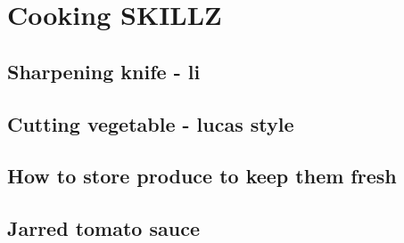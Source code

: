 \chapter{Cooking SKILLZ}

\section{Sharpening knife - li}

\section{Cutting vegetable - lucas style}

\section{How to store produce to keep them fresh}

\section{Jarred tomato sauce}